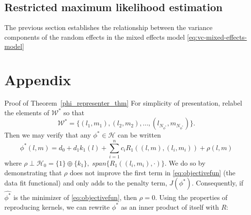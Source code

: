\documentclass[12pt]{article}
\theoremstyle{definition}
\begin{document}
\subsection{Restricted maximum likelihood estimation}

The previous section establishes the relationship between the variance components of the random effects in the mixed effects model \ref{eq:vc-mixed-effects-model}
















\section{Appendix} \label{appendix:appendix}


Proof of Theorem~\ref{phi_representer_thm}
 For simplicity of presentation, relabel the elements of $\mathcal{W}^*$ so that 
\[
\mathcal{W}^* = \lbrace \left( l_1,m_1 \right), \left( l_2,m_2 \right), \dots, \left( l_{N_{\phi^*}},m_{N_{\phi^*}} \right)  \rbrace.
\]
Then we may verify that any $\phi^* \in \mathcal{H}$ can be written 
\[
\phi^*\left(l,m \right) = d_0 + d_1k_1\left(l\right) + \sum_{i=1}^n  c_i R_1\left( \left(l,m\right) , \left(l_i,m_i \right)\right) + \rho\left(l,m\right)
\]
\noindent
where $\rho \perp \mathcal{H}_0 = \lbrace 1\rbrace \oplus \lbrace k_1\rbrace,\; span\lbrace R_1\left(\left(l_i, m_i \right),\cdot \right)  \rbrace$. We do so by demonstrating that  $\rho$ does not improve the first term in \eqref{eq:objectivefun} (the data fit functional) and only adds to the penalty term, $J\left(\phi^*\right)$. Consequently, if $\hat{\phi^*}$ is the minimizer of \eqref{eq:objectivefun}, then $\rho = 0$. Using the properties of reproducing kernels, we can rewrite $\phi^*$ as an inner product of itself with $R$:
 
\end{document}
